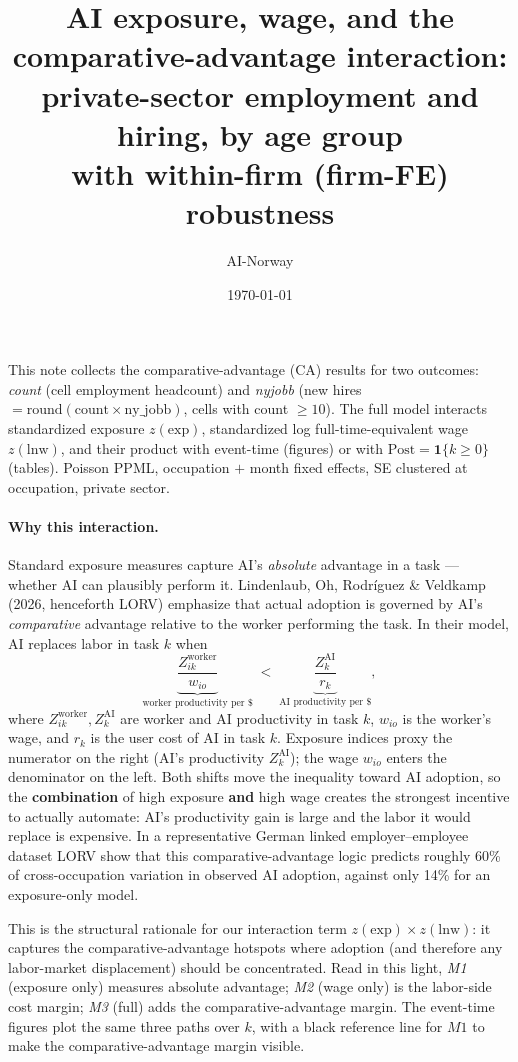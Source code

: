 \documentclass[11pt]{article}
\title{AI exposure, wage, and the comparative-advantage interaction:\\
       private-sector employment and hiring, by age group\\[4pt]
       \large with within-firm (firm-FE) robustness}
\author{AI-Norway}
\date{\today}
\begin{document}
\maketitle

\noindent
This note collects the comparative-advantage (CA) results for two outcomes:
\emph{count} (cell employment headcount) and \emph{nyjobb} (new hires
$=\text{round}(\text{count}\times\text{ny\_jobb})$, cells with count $\ge 10$).
The full model interacts standardized exposure $z(\text{exp})$, standardized
log full-time-equivalent wage $z(\text{lnw})$, and their product with event-time
(figures) or with $\text{Post}=\mathbf{1}\{k\ge 0\}$ (tables). Poisson PPML,
occupation $+$ month fixed effects, SE clustered at occupation, private sector.

\paragraph{Why this interaction.}
Standard exposure measures capture AI's \emph{absolute} advantage in a task
--- whether AI can plausibly perform it. Lindenlaub, Oh, Rodríguez \&
Veldkamp (2026, henceforth LORV) emphasize that actual adoption is governed
by AI's \emph{comparative} advantage relative to the worker performing the
task. In their model, AI replaces labor in task $k$ when
\begin{equation}
  \underbrace{\frac{Z_{ik}^{\text{worker}}}{w_{io}}}_{\text{worker
       productivity per }\$}
  \;<\;
  \underbrace{\frac{Z_k^{\text{AI}}}{r_k}}_{\text{AI
       productivity per }\$},
  \label{eq:lorv}
\end{equation}
where $Z_{ik}^{\text{worker}}, Z_k^{\text{AI}}$ are worker and AI
productivity in task $k$, $w_{io}$ is the worker's wage, and $r_k$ is the
user cost of AI in task $k$. Exposure indices proxy the numerator on the
right (AI's productivity $Z_k^{\text{AI}}$); the wage $w_{io}$ enters the
denominator on the left. Both shifts move the inequality toward AI
adoption, so the \textbf{combination} of high exposure \textbf{and} high
wage creates the strongest incentive to actually automate: AI's productivity
gain is large and the labor it would replace is expensive. In a
representative German linked employer--employee dataset LORV show that this
comparative-advantage logic predicts roughly 60\% of cross-occupation
variation in observed AI adoption, against only 14\% for an exposure-only
model.

This is the structural rationale for our interaction term
$z(\text{exp})\times z(\text{lnw})$: it captures the
comparative-advantage hotspots where adoption (and therefore any
labor-market displacement) should be concentrated. Read in this light,
\emph{M1} (exposure only) measures absolute advantage; \emph{M2} (wage
only) is the labor-side cost margin; \emph{M3} (full) adds the
comparative-advantage margin. The event-time figures plot the same three
paths over $k$, with a black reference line for $M1$ to make the
comparative-advantage margin visible.
\end{document}
